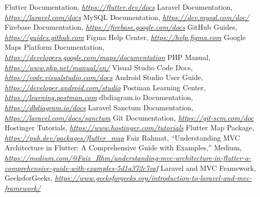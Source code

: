 \documentclass[12pt]{report}
\begin{document}
\vspace{1cm}

\newpage
{}

\begin{thebibliography}{18}
     Flutter Documentation, \textit{\url{https://flutter.dev/docs}}
     Laravel Documentation, \textit{\url{https://laravel.com/docs}}
     MySQL Documentation, \textit{\url{https://dev.mysql.com/doc/}}
     Firebase Documentation, \textit{\url{https://firebase.google.com/docs}}
     GitHub Guides, \textit{\url{https://guides.github.com}}
     Figma Help Center, \textit{\url{https://help.figma.com}}
     Google Maps Platform Documentation, \textit{\url{https://developers.google.com/maps/documentation}}
     PHP Manual, \textit{\url{https://www.php.net/manual/en/}}
     Visual Studio Code Docs, \textit{\url{https://code.visualstudio.com/docs}}
     Android Studio User Guide, \textit{\url{https://developer.android.com/studio}}
     Postman Learning Center, \textit{\url{https://learning.postman.com}}
     dbdiagram.io Documentation, \textit{\url{https://dbdiagram.io/docs}}
     Laravel Sanctum Documentation, \textit{\url{https://laravel.com/docs/sanctum}}
     Git Documentation, \textit{\url{https://git-scm.com/doc}}
     Hostinger Tutorials, \textit{\url{https://www.hostinger.com/tutorials}}
     Flutter Map Package, \textit{\url{https://pub.dev/packages/flutter_map}}
     Faiz Rahmat, “Understanding MVC Architecture in Flutter: A Comprehensive Guide with Examples,” Medium, \textit{\url{https://medium.com/@Faiz_Rhm/understanding-mvc-architecture-in-flutter-a-comprehensive-guide-with-examples-5d1a372c7eaf}}
     Laravel and MVC Framework, GeeksforGeeks, \textit{\url{https://www.geeksforgeeks.org/introduction-to-laravel-and-mvc-framework/}}
\end{thebibliography}

	
\end{document}
